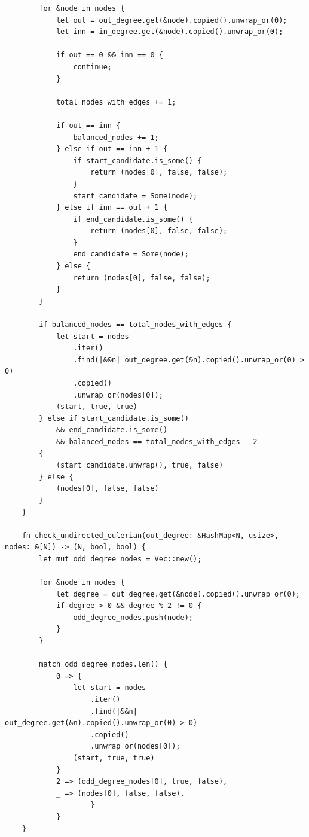 \begin{listing}[!ht]
\begin{verbatim}
        for &node in nodes {
            let out = out_degree.get(&node).copied().unwrap_or(0);
            let inn = in_degree.get(&node).copied().unwrap_or(0);

            if out == 0 && inn == 0 {
                continue;
            }

            total_nodes_with_edges += 1;

            if out == inn {
                balanced_nodes += 1;
            } else if out == inn + 1 {
                if start_candidate.is_some() {
                    return (nodes[0], false, false);
                }
                start_candidate = Some(node);
            } else if inn == out + 1 {
                if end_candidate.is_some() {
                    return (nodes[0], false, false);
                }
                end_candidate = Some(node);
            } else {
                return (nodes[0], false, false);
            }
        }

        if balanced_nodes == total_nodes_with_edges {
            let start = nodes
                .iter()
                .find(|&&n| out_degree.get(&n).copied().unwrap_or(0) > 0)
                .copied()
                .unwrap_or(nodes[0]);
            (start, true, true)
        } else if start_candidate.is_some()
            && end_candidate.is_some()
            && balanced_nodes == total_nodes_with_edges - 2
        {
            (start_candidate.unwrap(), true, false)
        } else {
            (nodes[0], false, false)
        }
    }

    fn check_undirected_eulerian(out_degree: &HashMap<N, usize>, nodes: &[N]) -> (N, bool, bool) {
        let mut odd_degree_nodes = Vec::new();

        for &node in nodes {
            let degree = out_degree.get(&node).copied().unwrap_or(0);
            if degree > 0 && degree % 2 != 0 {
                odd_degree_nodes.push(node);
            }
        }

        match odd_degree_nodes.len() {
            0 => {
                let start = nodes
                    .iter()
                    .find(|&&n| out_degree.get(&n).copied().unwrap_or(0) > 0)
                    .copied()
                    .unwrap_or(nodes[0]);
                (start, true, true)
            }
            2 => (odd_degree_nodes[0], true, false),
            _ => (nodes[0], false, false),
					}
			}
	}
\end{verbatim}
\end{listing}

